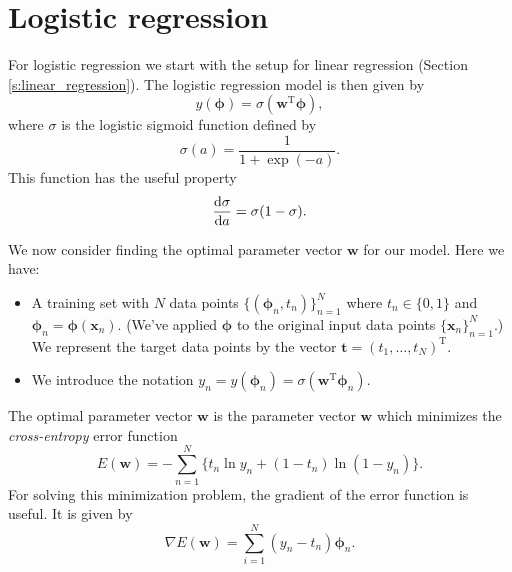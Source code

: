 \documentclass[11pt]{amsart}
\theoremstyle{definition}
\theoremstyle{remark}
\newcommand{\vect}[1]{\mathbf{#1}}
\newcommand{\transpose}{\text{T}}
\begin{document}
\section{Logistic regression}\label{s:logistic_regression}
    For logistic regression we start with the setup for linear regression (Section \ref{s:linear_regression}). The logistic regression model is then given by 
    \begin{equation*}
        y(\bm{\phi}) = \sigma(\vect{w}^\transpose \bm{\phi}),
    \end{equation*}
    where $\sigma$ is the logistic sigmoid function defined by
    \begin{equation*}
        \sigma(a) = \frac{1}{1 + \exp(-a)}.
    \end{equation*}
    This function has the useful property
    \begin{equation*}
        \dv{\sigma}{a} = \sigma(1 - \sigma).
    \end{equation*}
    
    We now consider finding the optimal parameter vector $\vect{w}$ for our model. Here we have:
    \begin{itemize}
        \item A training set with $N$ data points $\{(\bm{\phi}_n, t_n)\}_{n=1}^{N}$ where $t_n \in \{0, 1\}$ and $\bm{\phi}_n = \bm{\phi}(\vect{x}_n)$. (We've applied $\bm{\phi}$ to the original input data points $\{\vect{x}_n\}_{n=1}^{N}$.) We represent the target data points by the vector $\vect{t} = (t_1, \dots, t_N)^\transpose$.
        \item We introduce the notation $y_n = y(\bm{\phi}_n) = \sigma(\vect{w}^\transpose \bm{\phi}_n)$.
    \end{itemize}
    The optimal parameter vector $\vect{w}$ is the parameter vector $\vect{w}$ which minimizes the \emph{cross-entropy} error function
    \begin{equation}\label{e:cross_entropy}
        E(\vect{w}) =  - \sum_{n=1}^{N} 
                       \{t_n \ln y_n + (1 - t_n)\ln(1 - y_n)\}.
    \end{equation}
    For solving this minimization problem, the gradient of the error function is useful. It is given by
    \begin{equation*}
        \nabla E(\vect{w}) = \sum_{i=1}^{N} (y_n - t_n)\bm{\phi}_n.
    \end{equation*}
\end{document}
